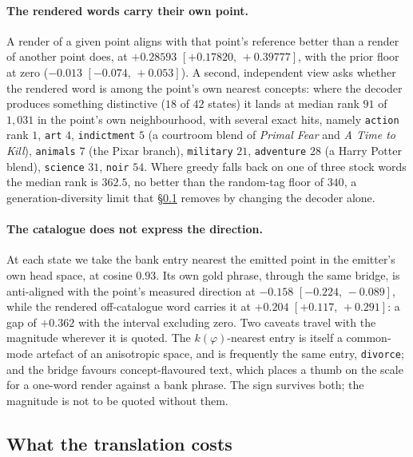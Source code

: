 \documentclass[11pt]{article}
\begin{document}
\paragraph{The rendered words carry their own point.} A render of a given point aligns with that
point's reference better than a render of another point does, at $+0.28593$
$[+0.17820,\,+0.39777]$, with the prior floor at zero ($-0.013$ $[-0.074,\,+0.053]$). A second,
independent view asks whether the rendered word is among the point's own nearest concepts: where the
decoder produces something distinctive ($18$ of $42$ states) it lands at median rank $91$ of
$1{,}031$ in the point's own neighbourhood, with several exact hits, namely \texttt{action} rank $1$,
\texttt{art} $4$, \texttt{indictment} $5$ (a courtroom blend of \emph{Primal Fear} and \emph{A Time to
Kill}), \texttt{animals} $7$ (the Pixar branch), \texttt{military} $21$, \texttt{adventure} $28$ (a
Harry Potter blend), \texttt{science} $31$, \texttt{noir} $54$. Where greedy falls back on one of
three stock words the median rank is $362.5$, no better than the random-tag floor of $340$, a
generation-diversity limit that \S\ref{sec:cost} removes by changing the decoder alone.

\paragraph{The catalogue does not express the direction.} At each state we take the bank entry nearest
the emitted point in the emitter's own head space, at cosine $0.93$. Its own gold phrase, through the
same bridge, is anti-aligned with the point's measured direction at $-0.158$ $[-0.224,\,-0.089]$,
while the rendered off-catalogue word carries it at $+0.204$ $[+0.117,\,+0.291]$: a gap of $+0.362$
with the interval excluding zero. Two caveats travel with the magnitude wherever it is quoted. The
$k(\varphi)$-nearest entry is itself a common-mode artefact of an anisotropic space, and is frequently
the same entry, \texttt{divorce}; and the bridge favours concept-flavoured text, which places a thumb
on the scale for a one-word render against a bank phrase. The sign survives both; the magnitude is not
to be quoted without them.

\subsection{What the translation costs}
\label{sec:cost}
\end{document}
